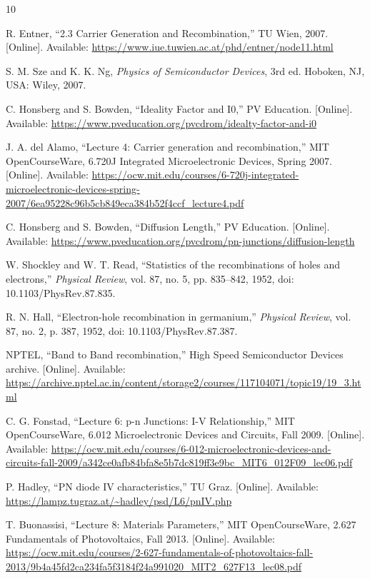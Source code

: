 \documentclass[11pt,a4paper]{article}
\begin{document}
\begin{thebibliography}{10}

R. Entner, ``2.3 Carrier Generation and Recombination,'' TU Wien, 2007. [Online]. Available: \url{https://www.iue.tuwien.ac.at/phd/entner/node11.html}

S. M. Sze and K. K. Ng, \emph{Physics of Semiconductor Devices}, 3rd ed. Hoboken, NJ, USA: Wiley, 2007.

C. Honsberg and S. Bowden, ``Ideality Factor and I0,'' PV Education. [Online]. Available: \url{https://www.pveducation.org/pvcdrom/idealty-factor-and-i0}

J. A. del Alamo, ``Lecture 4: Carrier generation and recombination,'' MIT OpenCourseWare, 6.720J Integrated Microelectronic Devices, Spring 2007. [Online]. Available: \url{https://ocw.mit.edu/courses/6-720j-integrated-microelectronic-devices-spring-2007/6ea95228c96b5cb849eca384b52f4ccf_lecture4.pdf}

C. Honsberg and S. Bowden, ``Diffusion Length,'' PV Education. [Online]. Available: \url{https://www.pveducation.org/pvcdrom/pn-junctions/diffusion-length}

W. Shockley and W. T. Read, ``Statistics of the recombinations of holes and electrons,'' \emph{Physical Review}, vol. 87, no. 5, pp. 835--842, 1952, doi: 10.1103/PhysRev.87.835.

R. N. Hall, ``Electron-hole recombination in germanium,'' \emph{Physical Review}, vol. 87, no. 2, p. 387, 1952, doi: 10.1103/PhysRev.87.387.

NPTEL, ``Band to Band recombination,'' High Speed Semiconductor Devices archive. [Online]. Available: \url{https://archive.nptel.ac.in/content/storage2/courses/117104071/topic19/19_3.html}

C. G. Fonstad, ``Lecture 6: p-n Junctions: I-V Relationship,'' MIT OpenCourseWare, 6.012 Microelectronic Devices and Circuits, Fall 2009. [Online]. Available: \url{https://ocw.mit.edu/courses/6-012-microelectronic-devices-and-circuits-fall-2009/a342ce0afb84bfa8e5b7dc819ff3e9bc_MIT6_012F09_lec06.pdf}

P. Hadley, ``PN diode IV characteristics,'' TU Graz. [Online]. Available: \url{https://lampz.tugraz.at/~hadley/psd/L6/pnIV.php}

T. Buonassisi, ``Lecture 8: Materials Parameters,'' MIT OpenCourseWare, 2.627 Fundamentals of Photovoltaics, Fall 2013. [Online]. Available: \url{https://ocw.mit.edu/courses/2-627-fundamentals-of-photovoltaics-fall-2013/9b4a45fd2ca234fa5f3184f24a991020_MIT2_627F13_lec08.pdf}

\end{thebibliography}
\end{document}
